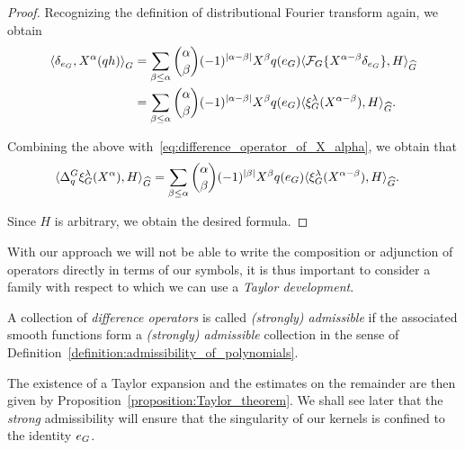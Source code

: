 \begin{proof}
    Recognizing the definition of distributional Fourier transform again,
    we obtain
    \begin{align*}
        \dualBracket [\Group] {\delta_{e_\Group}} {\LeftDifferentialOperator \alpha (qh)}
        &=
        \sum_{\beta \leq \alpha} \binom \alpha \beta
        (-1)^{\abs {\alpha - \beta}}
        \LeftDifferentialOperator \beta q(e_\Group)
        \dualBracket [\dualGroup \Group] {\Fourier\{\LeftDifferentialOperator {\alpha - \beta} \delta_{e_\Group}\}} {H}\\
        &=
        \sum_{\beta \leq \alpha} \binom \alpha \beta
        (-1)^{\abs {\alpha - \beta}}
        \LeftDifferentialOperator \beta q(e_\Group)
        \dualBracket [\dualGroup \Group] {\Rep \lambda(\LeftDifferentialOperator {\alpha - \beta})} {H}.
    \end{align*}

    Combining the above with~\eqref{eq:difference_operator_of_X_alpha},
    we obtain that
    \begin{align*}
        \dualBracket [\dualGroup \Group] {\DifferenceOperator q \Rep \lambda (\LeftDifferentialOperator \alpha)} {H}
        &=
        \sum_{\beta \leq \alpha} \binom \alpha \beta
        (-1)^{\abs \beta}
        \LeftDifferentialOperator \beta q(e_\Group)
        \dualBracket [\dualGroup \Group] {\Rep \lambda(\LeftDifferentialOperator {\alpha - \beta})} {H}.
    \end{align*}

    Since $H$ is arbitrary,
    we obtain the desired formula.
\end{proof}

With our approach
we will not be able to write the composition or adjunction of operators directly in terms of our symbols,
it is thus important to consider a family with respect to which we can use a \emph{Taylor development}.

\begin{definition}
\label{definition:admissibility_of_difference_operators}
    A collection of \emph{difference operators} is called \emph{(strongly) admissible}
    if the associated smooth functions form a \emph{(strongly) admissible} collection in the sense of Definition~\ref{definition:admissibility_of_polynomials}.
\end{definition}

The existence of a Taylor expansion and the estimates on the remainder are then given by Proposition~\ref{proposition:Taylor_theorem}.
We shall see later that the \emph{strong} admissibility will ensure that the singularity of our kernels is confined to the identity $e_G$.

